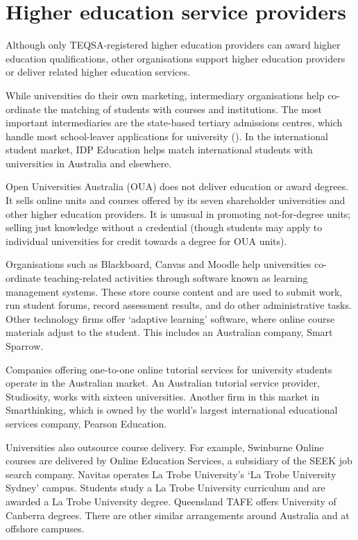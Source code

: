 \documentclass{grattan}
\begin{document}
%
\section{Higher education service providers }\label{sec:higher-education-service-providers}

Although only TEQSA-registered higher education providers can award higher education qualifications, other organisations support higher education providers or deliver related higher education services.

While universities do their own marketing, intermediary organisations help co-ordinate the matching of students with courses and institutions. The most important intermediaries are the state-based tertiary admissions centres, which handle most school-leaver applications for university (). In the international student market, IDP Education helps match international students with universities in Australia and elsewhere.

Open Universities Australia (OUA) does not deliver education or award degrees. It sells online units and courses offered by its seven shareholder universities and other higher education providers. It is unusual in promoting not-for-degree units; selling just knowledge without a credential (though students may apply to individual universities for credit towards a degree for OUA units).

Organisations such as Blackboard, Canvas and Moodle help universities co-ordinate teaching-related activities through software known as learning management systems. These store course content and are used to submit work, run student forums, record assessment results, and do other administrative tasks. Other technology firms offer `adaptive learning' software, where online course materials adjust to the student. This includes an Australian company, Smart Sparrow.

Companies offering one-to-one online tutorial services for university students operate in the Australian market. An Australian tutorial service provider, Studiosity, works with sixteen universities. Another firm in this market in Smarthinking, which is owned by the world's largest international educational services company, Pearson Education.

Universities also outsource course delivery. For example, Swinburne Online courses are delivered by Online Education Services, a subsidiary of the SEEK job search company. Navitas operates La Trobe University's `La Trobe University Sydney' campus. Students study a La Trobe University curriculum and are awarded a La Trobe University degree. Queensland TAFE offers University of Canberra degrees. There are other similar arrangements around Australia and at offshore campuses.
\end{document}
